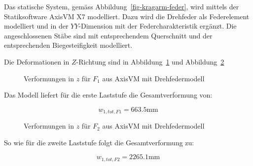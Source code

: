 \documentclass[
  11pt,
  letterpaper,
]{scrreprt}
\begin{document}
Das statische System, gemäss Abbildung~\ref{fig-kragarm-feder}, wird
mittels der Statiksoftware AxisVM X7 modelliert. Dazu wird die Drehfeder
als Federelement modelliert und in der \(YY\)-Dimension mit der
Federcharakteristik ergänzt. Die angeschlossenen Stäbe sind mit
entsprechendem Querschnitt und der entsprechenden Biegesteifigkeit
modelliert.

Die Deformationen in \(Z\)-Richtung sind in
Abbildung~\ref{fig-kragarm-drehfeder-10} und
Abbildung~\ref{fig-kragarm-drehfeder-215}

\begin{figure}[H]


\caption{\label{fig-kragarm-drehfeder-10}Verformungen in \(z\) für
\(F_1\) aus AxisVM mit Drehfedermodell}

\end{figure}%

Das Modell liefert für die erste Laststufe die Gesamtverformung von:

\[
w_{1,tot,F1} = 663.5 \text{mm}
\]

\begin{figure}[H]


\caption{\label{fig-kragarm-drehfeder-215}Verformungen in \(z\) für
\(F_2\) aus AxisVM mit Drehfedermodell}

\end{figure}%

So wie für die zweite Laststufe folgt die Gesamtverformung zu:

\[
w_{1,tot,F2} = 2265.1 \text{mm}
\]
\end{document}
